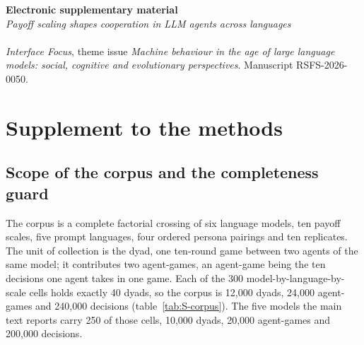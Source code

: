 \documentclass[openacc]{rsproca_new}
\newcommand{\rev}[1]{{\color{red}#1}}
\newcommand{\rev}[1]{#1}
\begin{document}
\begin{center}
  {\LARGE\bfseries Electronic supplementary material}\\[6pt]
  {\large\itshape Payoff scaling shapes cooperation in LLM agents across
   languages}\\[8pt]
  \rev{{\normalsize The Anh Han, Trung-Kiet Huynh, Dao-Sy Duy-Minh,
   Thanh-Bang Cao, Phong-Hao Le, Hong-Dan Nguyen, Phu-Quy Nguyen-Lam,
   Minh-Luan Nguyen-Vo, Hong-Phat Pham, Phu-Hoa Pham, Thien-Kim Than,
   Chi-Nguyen Tran, Huy Tran, Gia-Thoai Tran-Le, Alessio Buscemi and
   Le Hong Trang}\\[6pt]
  {\small\itshape Interface Focus}{\small, theme issue \emph{Machine
   behaviour in the age of large language models: social, cognitive and
   evolutionary perspectives}. Manuscript RSFS-2026-0050.}}
\end{center}
\vspace{1.0em}

\appendix


\setcounter{tocdepth}{2}
\tableofcontents
\clearpage

\section{Supplement to the methods}\label{appendix:methodology}

\subsection{Scope of the corpus and the completeness guard}\label{appendix:corpus}

The corpus is a complete factorial crossing of six language models, ten payoff
scales, five prompt languages, four ordered persona pairings and ten
replicates. The unit of collection is the dyad, one ten-round game between two
agents of the same model; it contributes two agent-games, an agent-game being
the ten decisions one agent takes in one game. Each of the 300
model-by-language-by-scale cells holds exactly 40 dyads, so the corpus is
12{,}000 dyads, 24{,}000 agent-games and 240{,}000 decisions
(table~\ref{tab:S-corpus}). The five models the main text reports carry 250 of
those cells, 10{,}000 dyads, 20{,}000 agent-games and 200{,}000 decisions.
\end{document}
